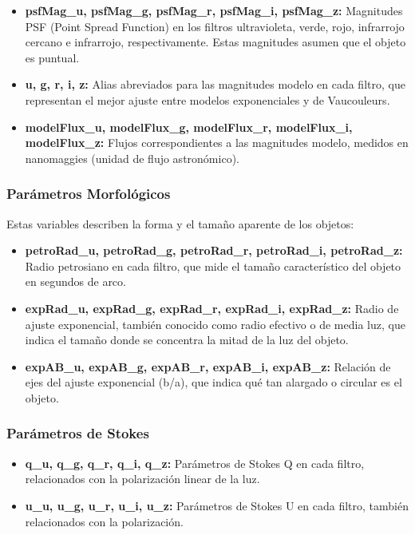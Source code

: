 \documentclass{article}
\begin{document}
\begin{itemize}
    \item \textbf{psfMag\_u, psfMag\_g, psfMag\_r, psfMag\_i, psfMag\_z:} Magnitudes PSF (Point Spread Function) en los filtros ultravioleta, verde, rojo, infrarrojo cercano e infrarrojo, respectivamente. Estas magnitudes asumen que el objeto es puntual.
    \item \textbf{u, g, r, i, z:} Alias abreviados para las magnitudes modelo en cada filtro, que representan el mejor ajuste entre modelos exponenciales y de Vaucouleurs.
    \item \textbf{modelFlux\_u, modelFlux\_g, modelFlux\_r, modelFlux\_i, modelFlux\_z:} Flujos correspondientes a las magnitudes modelo, medidos en nanomaggies (unidad de flujo astronómico).
\end{itemize}

\subsubsection{Parámetros Morfológicos}

Estas variables describen la forma y el tamaño aparente de los objetos:

\begin{itemize}
    \item \textbf{petroRad\_u, petroRad\_g, petroRad\_r, petroRad\_i, petroRad\_z:} Radio petrosiano en cada filtro, que mide el tamaño característico del objeto en segundos de arco.
    \item \textbf{expRad\_u, expRad\_g, expRad\_r, expRad\_i, expRad\_z:} Radio de ajuste exponencial, también conocido como radio efectivo o de media luz, que indica el tamaño donde se concentra la mitad de la luz del objeto.
    \item \textbf{expAB\_u, expAB\_g, expAB\_r, expAB\_i, expAB\_z:} Relación de ejes del ajuste exponencial (b/a), que indica qué tan alargado o circular es el objeto.
\end{itemize}

\subsubsection{Parámetros de Stokes}

\begin{itemize}
    \item \textbf{q\_u, q\_g, q\_r, q\_i, q\_z:} Parámetros de Stokes Q en cada filtro, relacionados con la polarización linear de la luz.
    \item \textbf{u\_u, u\_g, u\_r, u\_i, u\_z:} Parámetros de Stokes U en cada filtro, también relacionados con la polarización.
\end{itemize}
\end{document}
